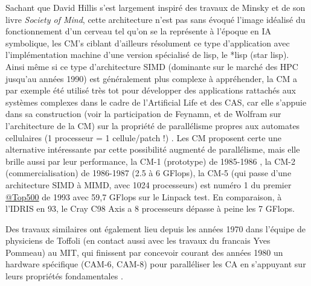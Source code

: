 Sachant que David Hillis s'est largement inspiré des travaux de Minsky et de son livre \textit{Society of Mind}, cette architecture n'est pas sans évoqué l'image idéalisé du fonctionnement d'un cerveau tel qu'on se la représente à l'époque en IA symbolique, les CM's ciblant d'ailleurs résolument ce type d'application avec l'implémentation machine d'une version spécialisé de lisp, le *lisp (star lisp). Ainsi même si ce type d’architecture SIMD (dominante sur le marché des HPC jusqu’au années 1990) est généralement plus complexe à appréhender, la CM a par exemple été utilisé très tot pour développer des applications rattachés aux systèmes complexes dans le cadre de l’Artificial Life et des CAS, car elle s’appuie dans sa construction (voir la participation de Feynamn, et de Wolfram sur l'architecture de la CM) sur la propriété de parallélisme propres aux automates cellulaires (1 processeur = 1 cellule/patch !) . Les CM proposent certe une alternative intéressante par cette possibilité augmenté de parallélisme, mais elle brille aussi par leur performance, la CM-1 (prototype) de 1985-1986 , la CM-2 (commercialisation) de 1986-1987 (2.5 à 6 GFlops), la CM-5 (qui passe d'une architecture SIMD à MIMD, avec 1024 processeurs) est numéro 1 du premier \href{http://www.top500.org/featured/systems/cm-5-los-alamos-national-lab/}{@Top500} de 1993 avec 59,7 GFlops sur le Linpack test. En comparaison, à l'IDRIS en 93, le Cray C98 Axis a 8 processeurs dépasse à peine les 7 GFlops.

Des travaux similaires ont également lieu depuis les années 1970 dans l’équipe de physiciens de Toffoli (en contact aussi avec les travaux du francais Yves Pommeau) au MIT, qui finissent par concevoir courant des années 1980 un hardware spécifique (CAM-6, CAM-8) pour paralléliser les CA en s’appuyant sur leurs propriétés fondamentales .

